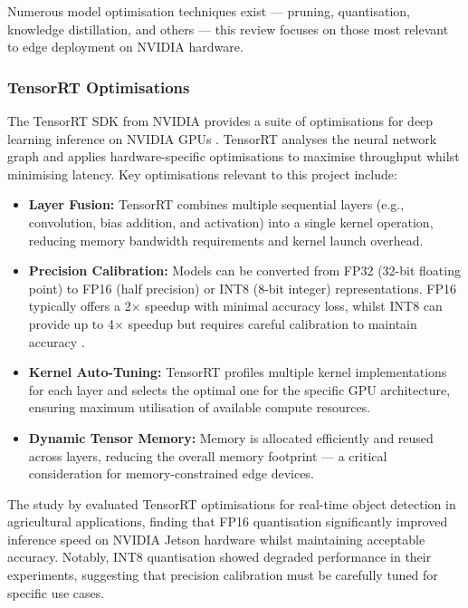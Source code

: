 Numerous model optimisation techniques exist --- pruning, quantisation,
knowledge distillation, and others --- this review focuses on those most
relevant to edge deployment on NVIDIA hardware.

\subsubsection{TensorRT Optimisations}
\label{sec:tensorrt_optimisations}

The TensorRT SDK from NVIDIA provides a suite of optimisations for deep
learning inference on NVIDIA GPUs \citep{nvidia2025tensorrt}. TensorRT analyses
the neural network graph and applies hardware-specific optimisations to
maximise throughput whilst minimising latency. Key optimisations relevant to
this project include:

\begin{itemize}
	\item \textbf{Layer Fusion:} TensorRT combines multiple sequential layers
	      (e.g., convolution, bias addition, and activation) into a single kernel
	      operation, reducing memory bandwidth requirements and kernel launch
	      overhead.
	\item \textbf{Precision Calibration:} Models can be converted from FP32
	      (32-bit floating point) to FP16 (half precision) or INT8 (8-bit
	      integer) representations. FP16 typically offers a 2$\times$ speedup
	      with minimal accuracy loss, whilst INT8 can provide up to 4$\times$
	      speedup but requires careful calibration to maintain accuracy
	      \citep{adewumi2025assessing}.
	\item \textbf{Kernel Auto-Tuning:} TensorRT profiles multiple kernel
	      implementations for each layer and selects the optimal one for the
	      specific GPU architecture, ensuring maximum utilisation of available
	      compute resources.
	\item \textbf{Dynamic Tensor Memory:} Memory is allocated efficiently and
	      reused across layers, reducing the overall memory footprint --- a
	      critical consideration for memory-constrained edge devices.
\end{itemize}

The study by \citet{adewumi2025assessing} evaluated TensorRT optimisations for
real-time object detection in agricultural applications, finding that FP16
quantisation significantly improved inference speed on NVIDIA Jetson hardware
whilst maintaining acceptable accuracy. Notably, INT8 quantisation showed
degraded performance in their experiments, suggesting that precision
calibration must be carefully tuned for specific use cases.

